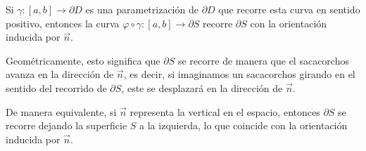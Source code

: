 \begin{observación}
Si \( \gamma : [a,b] \to \partial D \) es una parametrización de \( \partial D \) que recorre esta curva en sentido positivo, entonces la curva \( \varphi \circ \gamma : [a,b] \to \partial S \) recorre \( \partial S \) con la orientación inducida por \( \vec{n} \).

Geométricamente, esto significa que \( \partial S \) se recorre de manera que
el sacacorchos avanza en la dirección de \( \vec{n} \), es decir, si imaginamos
un sacacorchos girando en el sentido del recorrido de \( \partial S \), este se
desplazará en la dirección de \( \vec{n} \).

De manera equivalente, si \( \vec{n} \) representa la vertical en el espacio,
entonces \( \partial S \) se recorre dejando la superficie \( S \) a la
izquierda, lo que coincide con la orientación inducida por \( \vec{n} \).
\end{observación}

